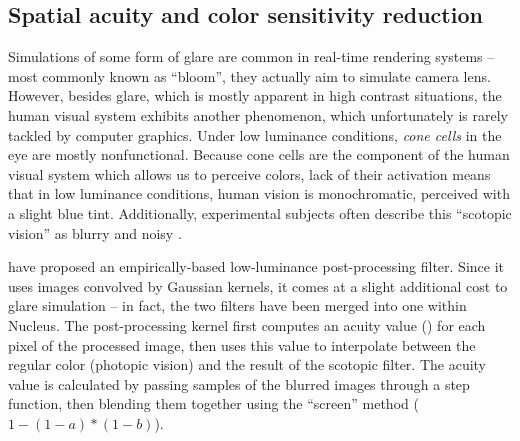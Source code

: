 \subsection{Spatial acuity and color sensitivity reduction}

Simulations of some form of glare are common in real-time rendering systems -- most commonly known as ``bloom'', they actually aim to simulate camera lens. However, besides glare, which is mostly apparent in high contrast situations, the human visual system exhibits another phenomenon, which unfortunately is rarely tackled by computer graphics. Under low luminance conditions, \emph{cone cells} in the eye are mostly nonfunctional. Because cone cells are the component of the human visual system which allows us to perceive colors, lack of their activation means that in low luminance conditions, human vision is monochromatic, perceived with a slight blue tint. Additionally, experimental subjects often describe this ``scotopic vision'' as blurry and noisy \cite{Thompson_aspatial}.

\citet{Thompson_aspatial} have proposed an empirically-based low-luminance post-processing filter. Since it uses images convolved by Gaussian kernels, it comes at a slight additional cost to glare simulation -- in fact, the two filters have been merged into one within Nucleus. The post-processing kernel first computes an acuity value () for each pixel of the processed image, then uses this value to interpolate between the regular color (photopic vision) and the result of the scotopic filter. The acuity value is calculated by passing samples of the blurred images through a step function, then blending them together using the ``screen'' method ($1 - (1-a)*(1-b)$).

